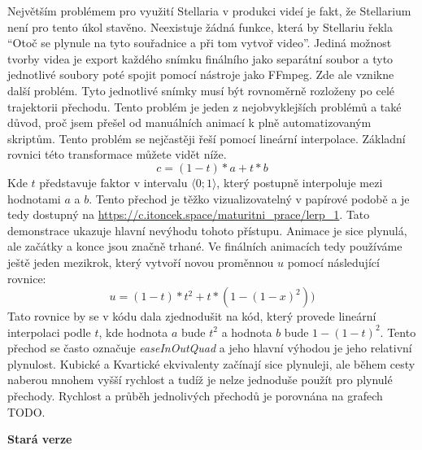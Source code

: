 \documentclass[12pt,a4paper,titlepage]{article}
\begin{document}
Největším problémem pro využití Stellaria v produkci videí je fakt, že Stellarium není pro tento úkol stavěno. Neexistuje žádná funkce, která by Stellariu řekla \enquote{Otoč se plynule na tyto souřadnice a při tom vytvoř video}. Jediná možnost tvorby videa je export každého snímku finálního jako separátní soubor a tyto jednotlivé soubory poté spojit pomocí nástroje jako FFmpeg. Zde ale vznikne další problém. Tyto jednotlivé snímky musí být rovnoměrně rozloženy po celé trajektorii přechodu. Tento problém je jeden z nejobvyklejších problémů a také důvod, proč jsem přešel od manuálních animací k plně automatizovaným skriptům. Tento problém se nejčastěji řeší pomocí lineární interpolace. Základní rovnici této transformace můžete vidět níže.
\[c = (1-t)*a + t * b\] 
Kde $t$ představuje faktor v intervalu $\langle0;1\rangle$, který postupně interpoluje mezi hodnotami $a$ a $b$. Tento přechod je těžko vizualizovatelný v papírové podobě a je tedy dostupný na \url{https://c.itoncek.space/maturitni_prace/lerp_1}. Tato demonstrace ukazuje hlavní nevýhodu tohoto přístupu. Animace je sice plynulá, ale začátky a konce jsou značně trhané. Ve finálních animacích tedy používáme ještě jeden mezikrok, který vytvoří novou proměnnou $u$ pomocí následující rovnice:
\[u = (1 - t) * t^2 + t * (1-(1-x)^2))\]
Tato rovnice by se v kódu dala zjednodušit na kód, který provede lineární interpolaci podle $t$, kde hodnota $a$ bude $t^{2}$ a hodnota $b$ bude $1-(1-t)^{2}$. Tento přechod se často označuje \textit{easeInOutQuad} a jeho hlavní výhodou je jeho relativní plynulost. Kubické a Kvartické ekvivalenty začínají sice plynuleji, ale během cesty naberou mnohem vyšší rychlost a tudíž je nelze jednoduše použít pro plynulé přechody. Rychlost a průběh jednolivých přechodů je porovnána na grafech TODO. 


\textbf{Stará verze}
\end{document}
